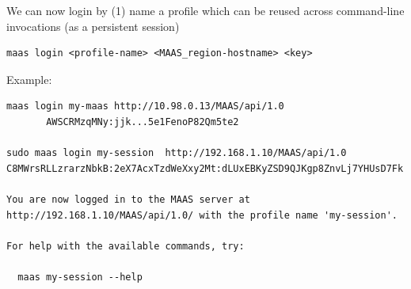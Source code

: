 We can now login by (1) name a profile which can be reused across command-line
invocations (as a persistent session)
\begin{verbatim}
maas login <profile-name> <MAAS_region-hostname> <key>
\end{verbatim}
Example:
\begin{verbatim}
maas login my-maas http://10.98.0.13/MAAS/api/1.0
       AWSCRMzqMNy:jjk...5e1FenoP82Qm5te2
       
sudo maas login my-session  http://192.168.1.10/MAAS/api/1.0 C8MWrsRLLzrarzNbkB:2eX7AcxTzdWeXxy2Mt:dLUxEBKyZSD9QJKgp8ZnvLj7YHUsD7Fk

You are now logged in to the MAAS server at
http://192.168.1.10/MAAS/api/1.0/ with the profile name 'my-session'.

For help with the available commands, try:

  maas my-session --help
       
\end{verbatim}

